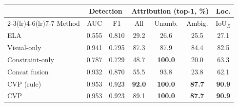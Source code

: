 \begin{tabular}{lcccccc}
\toprule
 & \multicolumn{2}{c}{Detection} & \multicolumn{3}{c}{Attribution (top-1, \%)} & Loc.\\
\cmidrule(lr){2-3}\cmidrule(lr){4-6}\cmidrule(lr){7-7}
Method & AUC & F1 & All & Unamb. & Ambig. & IoU$_{.5}$\\
\midrule
ELA & 0.555 & 0.810 & 29.2 & 26.6 & 25.5 & 27.1\\
Visual-only & 0.941 & 0.795 & 87.3 & 87.9 & 84.4 & 82.5\\
Constraint-only & 0.787 & 0.729 & 48.7 & \textbf{100.0} & 20.0 & 63.3\\
Concat fusion & 0.932 & 0.870 & 55.5 & 93.8 & 23.8 & 62.1\\
CVP (rule) & 0.953 & 0.923 & \textbf{92.0} & \textbf{100.0} & \textbf{87.7} & \textbf{90.9}\\
CVP & 0.953 & 0.923 & 89.1 & \textbf{100.0} & \textbf{87.7} & \textbf{90.9}\\
\bottomrule
\end{tabular}
